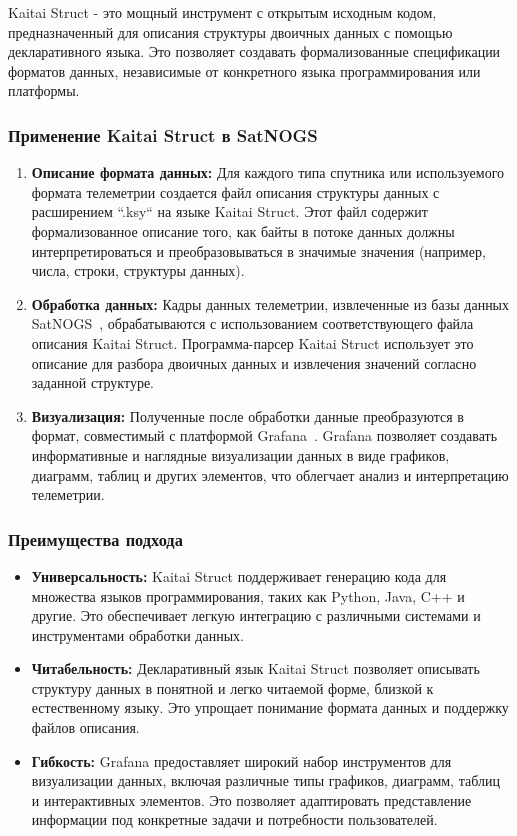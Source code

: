 \documentclass[14pt, a4paper]{extreport}
\begin{document}
    Kaitai Struct - это мощный инструмент с открытым исходным кодом, предназначенный для описания структуры двоичных данных с помощью декларативного языка.
    Это позволяет создавать формализованные спецификации форматов данных,  независимые от конкретного языка программирования или платформы.

    \subsubsection{Применение Kaitai Struct в SatNOGS}

    \begin{enumerate}
        \item \textbf{Описание формата данных:} Для каждого типа спутника или используемого формата телеметрии создается файл описания структуры данных с расширением ``.ksy`` на языке Kaitai Struct.
        Этот файл содержит формализованное описание того, как байты в потоке данных должны интерпретироваться и преобразовываться в значимые значения (например, числа, строки, структуры данных).
        \item \textbf{Обработка данных:} Кадры данных телеметрии, извлеченные из базы данных SatNOGS~\cite{satnogs_database_docs}, обрабатываются с использованием соответствующего файла описания Kaitai Struct.
        Программа-парсер Kaitai Struct использует это описание для разбора двоичных данных и извлечения значений согласно заданной структуре.
        \item \textbf{Визуализация:} Полученные после обработки данные преобразуются в формат, совместимый с платформой Grafana~\cite{satnogs_grafana_docs}.
        Grafana позволяет создавать информативные и наглядные визуализации данных в виде графиков, диаграмм, таблиц и других элементов,  что облегчает анализ и интерпретацию телеметрии.
    \end{enumerate}

    \subsubsection{Преимущества подхода}

    \begin{itemize}[label={--}]
        \item \textbf{Универсальность:} Kaitai Struct поддерживает генерацию кода для множества языков программирования, таких как Python, Java, C++ и другие.
        Это обеспечивает легкую интеграцию с различными системами и инструментами обработки данных.
        \item \textbf{Читабельность:}  Декларативный язык Kaitai Struct позволяет описывать структуру данных в понятной и легко читаемой форме,  близкой к естественному языку.
        Это упрощает понимание формата данных и поддержку файлов описания.
        \item \textbf{Гибкость:} Grafana предоставляет широкий набор инструментов для визуализации данных, включая различные типы графиков, диаграмм, таблиц и интерактивных элементов.
        Это позволяет адаптировать представление информации под конкретные задачи и потребности пользователей.
    \end{itemize}
\end{document}
